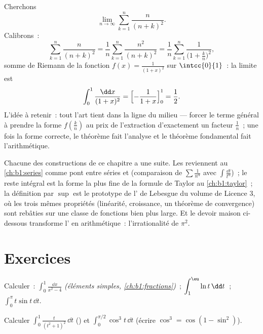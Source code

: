 \begin{example}\label{ex:b1:integration:riemann2}
Cherchons
\[
\lim_{n\to\infty} \sum_{k=1}^{n} \dfrac{n}{(n+k)^2} .
\]
Calibrons~:
\[
\sum_{k=1}^{n} \frac{n}{(n+k)^2}
= \frac{1}{n}\sum_{k=1}^{n} \frac{n^2}{(n+k)^2}
= \frac1n \sum_{k=1}^{n} \frac{1}{\bigl(1 + \frac kn\bigr)^2} ,
\]
somme de Riemann de la fonction  $f(x) = \frac{1}{(1+x)^2}$
sur $\intcc{0}{1}$~: la limite est
\[
\int_0^1 \frac{\dd x}{(1 + x)^2}
= \Bigl[-\frac{1}{1+x}\Bigr]_0^1 = \frac12 .
\]
L'idée à retenir~: tout l'art tient dans la ligne du milieu ---
forcer le terme général à prendre la forme $f(\frac kn)$ au prix
de l'extraction d'exactement un facteur $\frac1n$~; une fois la
forme correcte, le théorème fait l'analyse et le théorème
fondamental fait l'arithmétique.
\end{example}

\begin{remark}
Chacune des constructions de ce chapitre a une suite. Les  reviennent au \cref{ch:b1:series} comme pont entre séries
et  (comparaison de $\sum \frac{1}{n^\alpha}$ avec $\int
\frac{\dd t}{t^\alpha}$)~; le reste intégral est la forme la plus
fine de la formule de Taylor au \cref{ch:b1:taylor}~; la définition
par $\sup$ est le prototype de l' de Lebesgue du volume de
Licence 3, où les trois mêmes propriétés (linéarité, croissance, un
théorème de convergence) sont rebâties sur une classe de fonctions
bien plus large. Et le devoir maison ci-dessous transforme
l' en arithmétique~: l'irrationalité de
$\pi^2$.
\end{remark}

\section{Exercices}

\begin{exercise}[$\star$]\label{exo:b1:integration:1}
Calculer~: $\displaystyle\int_0^1 \frac{\dd x}{x^2 - 4}$
\emph{(éléments simples, \cref{ch:b1:fractions})}~;
$\displaystyle\int_1^{\eu} \ln t \,\dd t$~;
$\displaystyle\int_0^{\pi} t \sin t\, \dd t$.
\end{exercise}

\begin{exercise}[$\star$]\label{exo:b1:integration:2}
Calculer $\displaystyle\int_0^{1} \frac{t}{(t^2+1)^2}\,\dd t$
() et
$\displaystyle\int_0^{\pi/2} \cos^3 t\, \dd t$ (écrire $\cos^3 =
\cos(1 - \sin^2)$).
\end{exercise}


